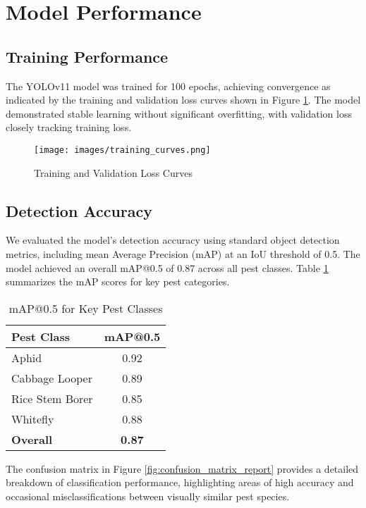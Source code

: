 \section{Model Performance}

\subsection{Training Performance}
The YOLOv11 model was trained for 100 epochs, achieving convergence as indicated by the training and validation loss curves shown in Figure \ref{fig:training_curves_report}. The model demonstrated stable learning without significant overfitting, with validation loss closely tracking training loss.

\begin{figure}[H]
    \centering
    \texttt{[image: images/training\_curves.png]}
    \caption{Training and Validation Loss Curves}
    \label{fig:training_curves_report}
\end{figure}

\subsection{Detection Accuracy}
We evaluated the model's detection accuracy using standard object detection metrics, including mean Average Precision (mAP) at an IoU threshold of 0.5. The model achieved an overall mAP@0.5 of 0.87 across all pest classes. Table \ref{tab:map_results_report} summarizes the mAP scores for key pest categories.

\begin{table}[H]
    \centering
    \caption{mAP@0.5 for Key Pest Classes}
    \begin{tabular}{|l|c|}
        \hline
        \textbf{Pest Class} & \textbf{mAP@0.5} \\
        \hline
        Aphid & 0.92 \\
        Cabbage Looper & 0.89 \\
        Rice Stem Borer & 0.85 \\
        Whitefly & 0.88 \\
        \hline
        \textbf{Overall} & \textbf{0.87} \\
        \hline
    \end{tabular}
    \label{tab:map_results_report}
\end{table}

The confusion matrix in Figure \ref{fig:confusion_matrix_report} provides a detailed breakdown of classification performance, highlighting areas of high accuracy and occasional misclassifications between visually similar pest species.

